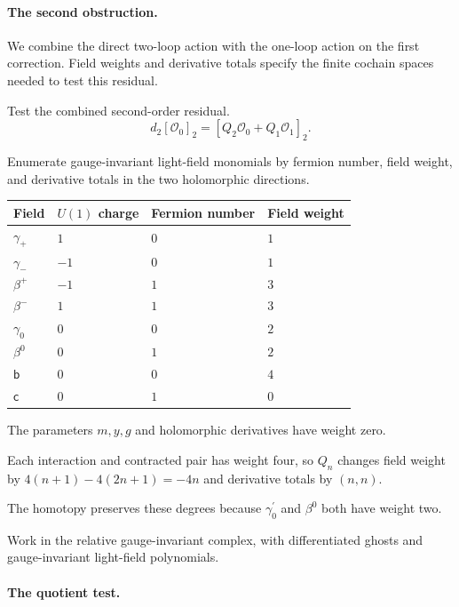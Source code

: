 \documentclass[11pt]{article}
\numberwithin{equation}{section}
\numberwithin{figure}{section}
\numberwithin{table}{section}
\begin{document}
\begin{proofbox}
\paragraph{The second obstruction.}\label{the-second-obstruction}

We combine the direct two-loop action with the one-loop action on the first correction. Field weights and derivative totals specify the finite cochain spaces needed to test this residual.

Test the combined second-order residual.
\begin{equation}\label{eq-SQEDcochains}
d_2[\mathcal O_0]_2=[Q_2\mathcal O_0+Q_1\mathcal O_1]_2.
\end{equation}

Enumerate gauge-invariant light-field monomials by fermion number, field weight, and derivative totals in the two holomorphic directions.

{\small\renewcommand{\arraystretch}{1.25}\setlength{\tabcolsep}{4pt}
\begin{xltabular}{\linewidth}{@{}lll>{\raggedright\arraybackslash}X@{}}
\toprule
Field & $U(1)$ charge & Fermion number & Field weight\\
\midrule\endhead
$\gamma_+$ & $1$ & $0$ & $1$\\
$\gamma_-$ & $-1$ & $0$ & $1$\\
$\beta^+$ & $-1$ & $1$ & $3$\\
$\beta^-$ & $1$ & $1$ & $3$\\
$\gamma_0$ & $0$ & $0$ & $2$\\
$\beta^0$ & $0$ & $1$ & $2$\\
$\mathsf b$ & $0$ & $0$ & $4$\\
$\mathsf c$ & $0$ & $1$ & $0$\\
\bottomrule
\end{xltabular}}

The parameters $m,y,g$ and holomorphic derivatives have weight zero.

Each interaction and contracted pair has weight four, so $Q_n$ changes field weight by $4(n+1)-4(2n+1)=-4n$ and derivative totals by $(n,n)$.

The homotopy preserves these degrees because $\gamma_0^{\prime}$ and $\beta^0$ both have weight two.

Work in the relative gauge-invariant complex, with differentiated ghosts and gauge-invariant light-field polynomials.

\paragraph{The quotient test.}\label{the-quotient-test}


\end{proofbox}
\end{document}
